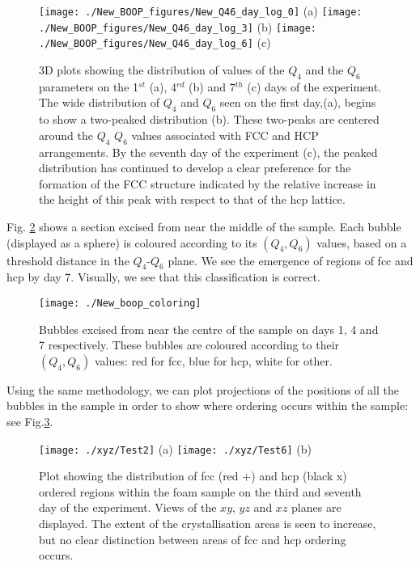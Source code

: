 \documentclass[10pt,a4paper]{article}
\begin{document}
\begin{figure}[H]
\centering
\texttt{[image: ./New\_BOOP\_figures/New\_Q46\_day\_log\_0]}
(a)
\texttt{[image: ./New\_BOOP\_figures/New\_Q46\_day\_log\_3]}
(b)
\texttt{[image: ./New\_BOOP\_figures/New\_Q46\_day\_log\_6]}
(c)
\caption{3D plots showing the distribution of values of the $Q_4$ and the $Q_6$ parameters on the 1$^{st}$ (a), 4$^{rd}$ (b) and 7$^{th}$ (c) days of the
experiment. The wide distribution of $Q_4$ and $Q_6$ seen on the first day,(a), begins to show a two-peaked distribution (b). These two-peaks are centered around the $Q_4$ $Q_6$ values associated with FCC and HCP arrangements. By the seventh day of the experiment (c), the peaked distribution has continued to develop a clear preference for the formation of the FCC structure indicated by the relative increase in the height of this peak with respect to that of
the hcp lattice.}
\label{fig:Boop_comparison}
\end{figure}

Fig. \ref{fig:Boop_coloring_1} shows a section excised from near the middle of the sample. Each bubble (displayed as a sphere) is coloured according to its $(Q_4, Q_6)$ values, based on a threshold distance in the $Q_4$-$Q_6$ plane. We see the emergence of regions of fcc and hcp by day 7. Visually, we see that this classification is correct.

\begin{figure}[H]
\centering
\texttt{[image: ./New\_boop\_coloring]}
\caption{Bubbles excised from near the centre of the sample on days 1, 4 and 7 respectively. These bubbles are coloured according to their $(Q_{4},Q_{6})$ values: red for fcc, blue for hcp, white for other.}
\label{fig:Boop_coloring_1}
\end{figure}

Using the same methodology, we can plot projections of the positions of all the bubbles in the sample in order to show where ordering occurs within the sample: see Fig.\ref{fig:Boop_coloring_2}.

\begin{figure}[H]
\centering
\texttt{[image: ./xyz/Test2]}
(a)
\texttt{[image: ./xyz/Test6]}
(b)
\caption{Plot showing the distribution of fcc (red +) and hcp (black x) ordered regions within the foam sample on the third and seventh day of the experiment. Views of the $xy$, $yz$ and $xz$ planes are displayed. The extent of the crystallisation areas is seen to increase, but no clear distinction between
areas of fcc and hcp ordering occurs. }
\label{fig:Boop_coloring_2}
\end{figure}
\end{document}
